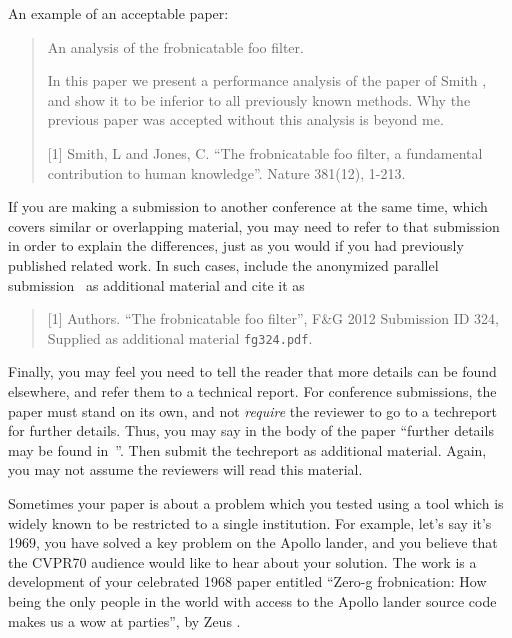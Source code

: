 \documentclass[10pt,twocolumn,letterpaper]{article}
\begin{document}
An example of an acceptable paper:

\begin{quote}
  \begin{center}
    An analysis of the frobnicatable foo filter.
  \end{center}

  In this paper we present a performance analysis of the paper of
  Smith \etal [1], and show it to be inferior to all previously known
  methods.  Why the previous paper was accepted without this analysis
  is beyond me.

  [1] Smith, L and Jones, C. ``The frobnicatable foo filter, a
  fundamental contribution to human knowledge''.  Nature 381(12),
  1-213.
\end{quote}

If you are making a submission to another conference at the same time,
which covers similar or overlapping material, you may need to refer to
that submission in order to explain the differences, just as you would
if you had previously published related work.  In such cases, include
the anonymized parallel submission~\cite{Authors12} as additional
material and cite it as
\begin{quote} [1] Authors. ``The frobnicatable foo filter'', F\&G 2012
  Submission ID 324, Supplied as additional material {\tt fg324.pdf}.
\end{quote}

Finally, you may feel you need to tell the reader that more details
can be found elsewhere, and refer them to a technical report.  For
conference submissions, the paper must stand on its own, and not {\em
  require} the reviewer to go to a techreport for further details.
Thus, you may say in the body of the paper ``further details may be
found in~\cite{Authors12b}''.  Then submit the techreport as
additional material.  Again, you may not assume the reviewers will
read this material.

Sometimes your paper is about a problem which you tested using a tool
which is widely known to be restricted to a single institution.  For
example, let's say it's 1969, you have solved a key problem on the
Apollo lander, and you believe that the CVPR70 audience would like to
hear about your solution.  The work is a development of your
celebrated 1968 paper entitled ``Zero-g frobnication: How being the
only people in the world with access to the Apollo lander source code
makes us a wow at parties'', by Zeus \etal.
\end{document}
